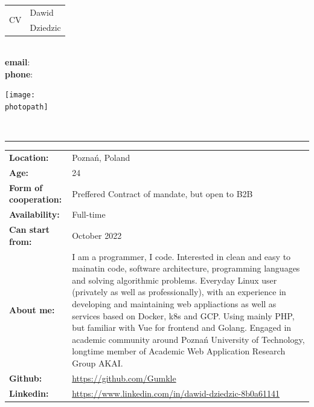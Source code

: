 \documentclass[10pt]{letter}
\newcommand{\firstname}{Dawid}
\newcommand{\lastname}{Dziedzic}
\newcommand{\age}{24}
\newcommand{\whereami}{Poznań, Poland}
\newcommand{\applyfor}{Golang Developer}
\newcommand{\form}{Preffered Contract of mandate, but open to B2B}
\newcommand{\availability}{Full-time}
\newcommand{\startfrom}{October 2022}
\newcommand{\photopath}{zdjecie.jpg}
\newcommand{\github}{https://github.com/Gumkle}
\newcommand{\linkedin}{https://www.linkedin.com/in/dawid-dziedzic-8b0a61141}
\newcommand{\aboutme}{
    I am a programmer, I code. Interested in clean and easy to 
    mainatin code, software architecture, programming languages and 
    solving algorithmic problems. Everyday Linux user 
    (privately as well as professionally), with an experience in 
    developing and maintaining  web appliactions as well as 
    services based on Docker, k8s and GCP. Using mainly PHP, but
    familiar with Vue for frontend and Golang. Engaged in 
    academic community around Poznań University of Technology, 
    longtime member of Academic Web Application Research Group AKAI.
}
\begin{document}
    \begin{minipage}[t]{0.5\textwidth}
        \begin{tabular}{r | l}
            \multirow{2}{*}{\fontsize{70pt}{70pt} \selectfont CV} & \large{\firstname} \\
            & \large{\lastname} \\[4ex]
        \end{tabular} \\[2\baselineskip]
        \hspace*{1cm}\textbf{email}: \email \\
        \hspace*{1cm}\textbf{phone}: \phone
    \end{minipage}
    \hfill
    \begin{minipage}{0.5\textwidth}
        \begin{flushright}
            \texttt{[image: \\photopath]}            
        \end{flushright}
    \end{minipage}
    \\[1\baselineskip]
    \hrule
    \begin{tabular}{p{4cm} l}
        \textbf{Location:} & \whereami\\
        \textbf{Age:} & \age\\
        \textbf{Form of cooperation:} & \form\\
        \textbf{Availability:} & \availability\\
        \textbf{Can start from:} & \startfrom\\
        \vspace{-40pt}\textbf{About me:} & \begin{minipage}{0.75\textwidth}
            \aboutme
        \end{minipage}\\
        \textbf{Github:} & \href{\github}{\github}\\
        \textbf{Linkedin:} & \href{\linkedin}{\linkedin}\\
    \end{tabular}\\[2\baselineskip]
\end{document}
